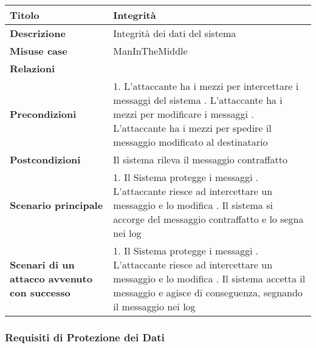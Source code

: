\begin{tabular} {|P{4cm}|P{13cm}|}
  \hline
  \textbf{Titolo}                                      & Integrità                                     \\
  \hline
  \textbf{Descrizione}                                 & Integrità dei dati del sistema                \\
  \hline
  \textbf{Misuse case}                                 & ManInTheMiddle                                \\
  \hline
  \textbf{Relazioni}                                   &                                               \\
  \hline
  \textbf{Precondizioni}                               & 1. L'attaccante ha i mezzi per intercettare i
  messaggi del sistema . L'attaccante ha i mezzi per modificare i messaggi
  . L'attaccante ha i mezzi per spedire il messaggio modificato al
  destinatario                                                                                         \\
  \hline
  \textbf{Postcondizioni}                              & Il sistema rileva il messaggio contraffatto   \\
  \hline
  \textbf{Scenario principale}                         & 1. Il Sistema protegge i messaggi . L'attaccante riesce ad intercettare un messaggio e lo modifica . Il
  sistema si accorge del messaggio contraffatto e lo segna nei log                                     \\
  \hline
  \textbf{Scenari di un attacco avvenuto con successo} & 1. Il Sistema protegge
  i messaggi . L'attaccante riesce ad intercettare un messaggio e
  lo modifica . Il sistema accetta il messaggio e agisce di conseguenza,
  segnando il messaggio nei log                                                                        \\
  \hline
\end{tabular}
\hfill
\break


\subsubsection{Requisiti di Protezione dei Dati}

